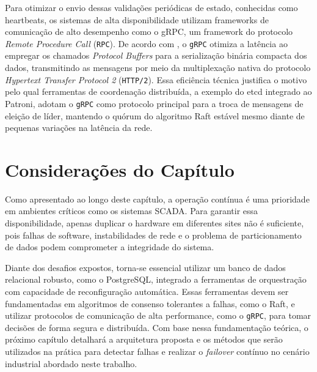     Para otimizar o envio dessas validações periódicas de estado, conhecidas como heartbeats, os sistemas de alta disponibilidade utilizam frameworks de comunicação de alto desempenho como o gRPC, um framework do protocolo \textit{Remote Procedure Call} (\verb|RPC|). De acordo com , o \verb|gRPC| otimiza a latência ao empregar os chamados \textit{Protocol Buffers} para a serialização binária compacta dos dados, transmitindo as mensagens por meio da multiplexação nativa do protocolo \textit{Hypertext Transfer Protocol 2} (\verb|HTTP/2|). Essa eficiência técnica justifica o motivo pelo qual ferramentas de coordenação distribuída, a exemplo do etcd integrado ao Patroni, adotam o \verb|gRPC| como protocolo principal para a troca de mensagens de eleição de líder, mantendo o quórum do algoritmo Raft estável mesmo diante de pequenas variações na latência da rede.

\section{Considerações do Capítulo}

        Como apresentado ao longo deste capítulo, a operação contínua é uma prioridade em ambientes críticos como os sistemas SCADA. Para garantir essa disponibilidade, apenas duplicar o hardware em diferentes sites não é suficiente, pois falhas de software, instabilidades de rede e o problema de particionamento de dados podem comprometer a integridade do sistema.

        Diante dos desafios expostos, torna-se essencial utilizar um banco de dados relacional robusto, como o PostgreSQL, integrado a ferramentas de orquestração com capacidade de reconfiguração automática. Essas ferramentas devem ser fundamentadas em algoritmos de consenso tolerantes a falhas, como o Raft, e utilizar protocolos de comunicação de alta performance, como o \verb|gRPC|, para tomar decisões de forma segura e distribuída. Com base nessa fundamentação teórica, o próximo capítulo detalhará a arquitetura proposta e os métodos que serão utilizados na prática para detectar falhas e realizar o \textit{failover} contínuo no cenário industrial abordado neste trabalho.